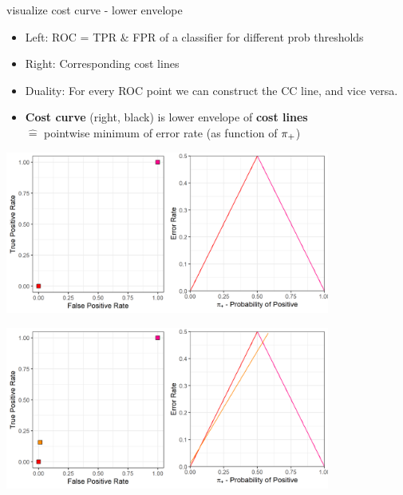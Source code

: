 \documentclass[11pt,compress,t,notes=noshow, xcolor=table]{beamer}
\begin{document}
\begin{frame}{visualize cost curve - lower envelope}

    \begin{itemize}
        \footnotesize
        \item<1-> Left: ROC = TPR $\&$ FPR of a classifier for different prob thresholds
        \item<1-> Right: Corresponding cost lines
        \item<1-> Duality:
        For every ROC point we can construct the CC line, and vice versa.
		\item<4-> \textbf{Cost curve} (right, black) is lower envelope of \textbf{cost lines} \\
		$\hat{=}$ pointwise minimum of error rate (as function of $\pi_{+}$)
	\end{itemize}
   {
    \begin{center}
      \includegraphics[width=0.8\textwidth]{figure/lower_envelope_1.png}
    \end{center}
  }
   {
    \begin{center}
      \includegraphics[width=0.8\textwidth]{figure/lower_envelope_2.png}
    \end{center}
  }
   {
    \begin{center}

\end{center}}
\end{frame}
\end{document}
